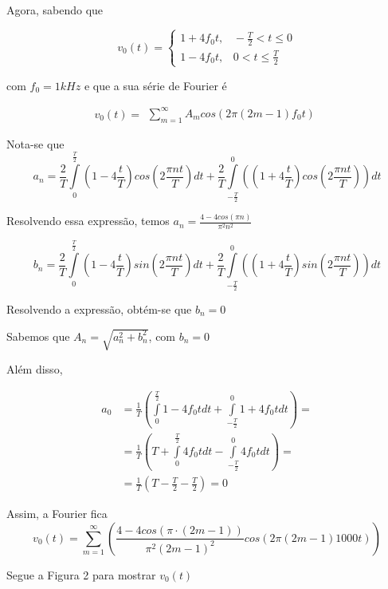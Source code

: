 Agora, sabendo que 

\begin{equation*}
v_0(t)=\left\{
\begin{array}{lr}
1+4f_0t,\hspace{10pt} -\frac{T}{2}<t\leq0\\
1-4f_0t,\hspace{10pt} 0<t\leq\frac{T}{2}
\end{array}\right.
\end{equation*}

com $f_0=1kHz$ e que a sua série de Fourier é

\begin{equation*}
v_0(t)=
\begin{array}{lr}
\sum\limits_{m=1}^\infty A_m cos (2\pi(2m-1)f_0t)
\end{array}
\end{equation*}

Nota-se que 
\[a_n=\frac{2}{T}\int\limits_0^\frac{T}{2}\left(1-4\frac{t}{T}\right)cos\left(2\frac{\pi nt}{T}\right)dt+\frac{2}{T}\int\limits_{-\frac{T}{2}}^0\left(\left(1+4\frac{t}{T}\right)cos\left(2\frac{\pi nt}{T}\right)\right)dt\]

Resolvendo essa expressão, temos $a_n=\frac{4-4cos(\pi n)}{\pi^2n^2}$

\[b_n=\frac{2}{T}\int\limits_0^\frac{T}{2}\left(1-4\frac{t}{T}\right)sin\left(2\frac{\pi nt}{T}\right)dt+\frac{2}{T}\int\limits_{-\frac{T}{2}}^0\left(\left(1+4\frac{t}{T}\right)sin\left(2\frac{\pi nt}{T}\right)\right)dt\]

Resolvendo a expressão, obtém-se que $b_n=0$

Sabemos que $A_n=\sqrt{a_n^2+b_n^2}$, com $b_n=0$

Além disso, 

\begin{align*}
a_0&=\frac{1}{T}\left(\int\limits_0^{\frac{T}{2}}1-4f_0tdt+\int\limits^0_{-\frac{T}{2}}1+4f_0tdt\right)=\\
&=\frac{1}{T}\left(T+\int\limits_0^{\frac{T}{2}}4f_0tdt-\int\limits^0_{-\frac{T}{2}}4f_0tdt\right)=\\
&=\frac{1}{T}\left(T-\frac{T}{2}-\frac{T}{2}\right)=0
\end{align*}

Assim, a Fourier fica 
\[v_0(t)=\sum\limits_{m=1}^\infty \left(\frac{4-4cos(\pi\cdot(2m-1))}{\pi^2(2m-1)^2} cos (2\pi(2m-1)1000t)\right)\]

Segue a Figura 2 para mostrar $v_0(t)$

